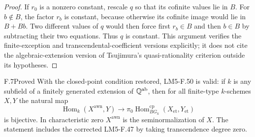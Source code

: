 \begin{proof}
If $r_0$ is a nonzero constant, rescale $q$ so that its cofinite
values lie in $B$. For $b\notin B$, the factor $r_b$ is constant,
because otherwise its cofinite image would lie in $B+Bb$.
Two different values of $q$ would then force first $r_b\in B$
and then $b\in B$ by subtracting their two equations. Thus $q$
is constant. This argument verifies the finite-exception and
transcendental-coefficient versions explicitly; it does not cite the
algebraic-extension version of Tsujimura's quasi-rationality
criterion outside its hypotheses.
\end{proof}

\begin{claim}{F.7}{Proved}
With the closed-point condition restored, LM5-F.50 is valid: if $k$
is any subfield of a finitely generated extension of
$\mathbb Q^{\mathrm{ab}}$, then for all finite-type $k$-schemes $X,Y$
the natural map
\[
\operatorname{Hom}_k(X^{\mathrm{awn}},Y)
\longrightarrow
\pi_0\operatorname{Hom}^{\mathrm{cp}}_{B G_k}
 (X_{\mathrm{et}},Y_{\mathrm{et}})
\]
is bijective. In characteristic zero $X^{\mathrm{awn}}$ is the
seminormalization of $X$. The statement includes the corrected
LM5-F.47 by taking transcendence degree zero.
\end{claim}
